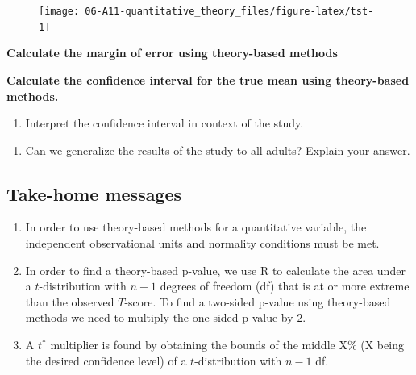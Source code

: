 \documentclass[
]{report}
\providecommand{\tightlist}{%
  \setlength{\itemsep}{0pt}\setlength{\parskip}{0pt}}
\begin{document}
\begin{figure}

{\centering \texttt{[image: 06-A11-quantitative\_theory\_files/figure-latex/tst-1]} 

}

\end{figure}

\newpage

\textbf{Calculate the margin of error using theory-based methods}

\vspace{0.6in}

\textbf{Calculate the confidence interval for the true mean using theory-based methods.}

\vspace{0.8in}

\begin{enumerate}
\def\labelenumi{\arabic{enumi}.}
\setcounter{enumi}{6}
\tightlist
\item
  Interpret the confidence interval in context of the study.
\end{enumerate}

\vspace{1in}

\begin{enumerate}
\def\labelenumi{\arabic{enumi}.}
\setcounter{enumi}{7}
\tightlist
\item
  Can we generalize the results of the study to all adults? Explain your answer.
\end{enumerate}

\vspace{0.5in}

\subsection{Take-home messages}\label{take-home-messages-10}

\begin{enumerate}
\def\labelenumi{\arabic{enumi}.}
\item
  In order to use theory-based methods for a quantitative variable, the independent observational units and normality conditions must be met.
\item
  In order to find a theory-based p-value, we use R to calculate the area under a \(t\)-distribution with \(n - 1\) degrees of freedom (df) that is at or more extreme than the observed \(T\)-score. To find a two-sided p-value using theory-based methods we need to multiply the one-sided p-value by 2.
\item
  A \(t^*\) multiplier is found by obtaining the bounds of the middle X\% (X being the desired confidence level) of a \(t\)-distribution with \(n - 1\) df.
\end{enumerate}
\end{document}
